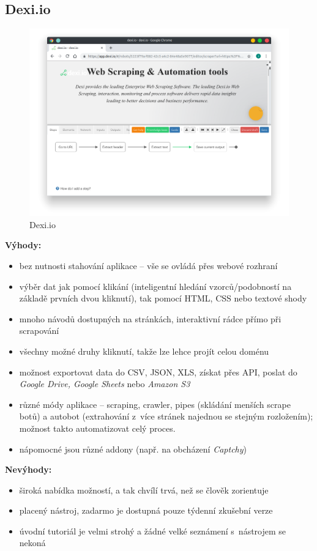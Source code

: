 \documentclass[thesis=B,czech]{FITthesis}[2012/06/26]
\begin{document}
\subsection{Dexi.io}
\begin{figure}[h]
	\includegraphics[width=\linewidth]{images/Dexiio.png}
	\caption{Dexi.io}
	\label{fig:dexi.io}
\end{figure}
\textbf{Výhody:}
\begin{itemize}
	\item bez nutnosti stahování aplikace -- vše se ovládá přes webové rozhraní
	\item výběr dat jak pomocí klikání (inteligentní hledání vzorců/podobností na základě prvních dvou kliknutí), tak pomocí HTML, CSS nebo textové shody
	\item mnoho návodů dostupných na stránkách, interaktivní rádce přímo při scrapování
	\item všechny možné druhy kliknutí, takže lze lehce projít celou doménu
	\item možnost exportovat data do CSV, JSON, XLS, získat přes API, poslat do \emph{Google Drive, Google Sheets} nebo \emph{Amazon S3}
	\item různé módy aplikace -- scraping, crawler, pipes (skládání menších scrape botů) a autobot (extrahování z~více stránek najednou se stejným rozložením); možnost takto automatizovat celý proces.
	\item nápomocné jsou různé addony (např. na obcházení \emph{Captchy})
\end{itemize}
\textbf{Nevýhody:}
\begin{itemize}
	\item široká nabídka možností, a tak chvílí trvá, než se člověk zorientuje
	\item placený nástroj, zadarmo je dostupná pouze týdenní zkušební verze
	\item úvodní tutoriál je velmi strohý a žádné velké seznámení s~nástrojem se nekoná
\end{itemize}
\end{document}
